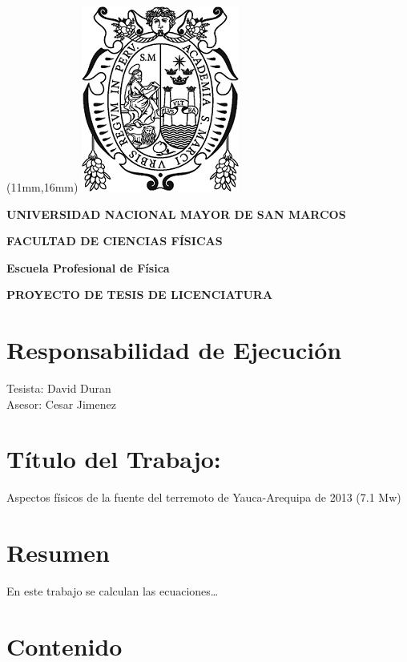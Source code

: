 \documentclass[a4paper,11pt]{article}
\begin{document}
\thispagestyle{empty}

\addtolength{\topmargin}{-1cm}
\addtolength{\headsep}{-1cm}
\enlargethispage{0.5cm}
\addtolength{\footskip}{0.5cm}

\begin{textblock*}{297mm} (11mm,16mm)
	\includegraphics[scale=0.28]{unmsm-logo}
\end{textblock*}

\par
\centerline{\large \textbf{UNIVERSIDAD NACIONAL MAYOR DE SAN MARCOS}}
\vspace{8pt}
\centerline{\large\textbf{FACULTAD DE CIENCIAS FÍSICAS}}
\vspace{8pt}
\centerline{\large\textbf{Escuela Profesional de Física}}
\vspace{8pt}
\centerline{\large\textbf{PROYECTO DE TESIS DE LICENCIATURA}}
\vspace{10pt}


\section{Responsabilidad de Ejecución}
Tesista: David Duran \\
Asesor: Cesar Jimenez  \\


\section{Título del Trabajo:}
Aspectos físicos de la fuente del terremoto de Yauca-Arequipa de 2013 (7.1 Mw)

\section{Resumen }
En este trabajo se calculan las ecuaciones\ldots

\section{Contenido}
\end{document}
